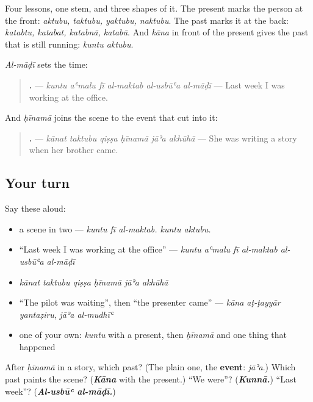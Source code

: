 \begin{grammarlens}[title={What you've built}]
Four lessons, one stem, and three shapes of it. The present marks the person at the front: \emph{aktubu, taktubu, yaktubu, naktubu}. The past marks it at the back: \emph{katabtu, katabat, katabnā, katabū}. And \emph{kāna} in front of the present gives the past that is still running: \emph{kuntu aktubu}.

\emph{Al-māḍī} sets the time:

\begin{quote}
\textbf{     .} — \emph{kuntu aʿmalu fī al-maktab al-usbūʿa al-māḍī} — Last week I was working at the office.
\end{quote}

And \emph{ḥīnamā} joins the scene to the event that cut into it:

\begin{quote}
\textbf{     .} — \emph{kānat taktubu qiṣṣa ḥīnamā jāʾa akhūhā} — She was writing a story when her brother came.
\end{quote}
\end{grammarlens}

\subsection*{Your turn}
Say these aloud:

\begin{itemize}
\raggedright
  \item a scene in two — \emph{kuntu fī al-maktab. kuntu aktubu.}
  \item \textquotedblleft{}Last week I was working at the office\textquotedblright{} — \emph{kuntu aʿmalu fī al-maktab al-usbūʿa al-māḍī}
  \item \emph{kānat taktubu qiṣṣa ḥīnamā jāʾa akhūhā}
  \item \textquotedblleft{}The pilot was waiting\textquotedblright{}, then \textquotedblleft{}the presenter came\textquotedblright{} — \emph{kāna aṭ-ṭayyār yantaẓiru}, \emph{jāʾa al-mudhīʿ}
  \item one of your own: \emph{kuntu} with a present, then \emph{ḥīnamā} and one thing that happened
\end{itemize}

\begin{tcolorbox}[breakable,colback=teal!4,colframe=teal!35!black,title={Before you move on}]
After \emph{ḥīnamā} in a story, which past? (The plain one, the \textbf{event}: \emph{jāʾa}.) Which past paints the scene? (\emph{\textbf{Kāna}} with the present.) \textquotedblleft{}We were\textquotedblright{}? (\emph{\textbf{Kunnā.}}) \textquotedblleft{}Last week\textquotedblright{}? (\emph{\textbf{Al-usbūʿ al-māḍī.}})
\end{tcolorbox}

